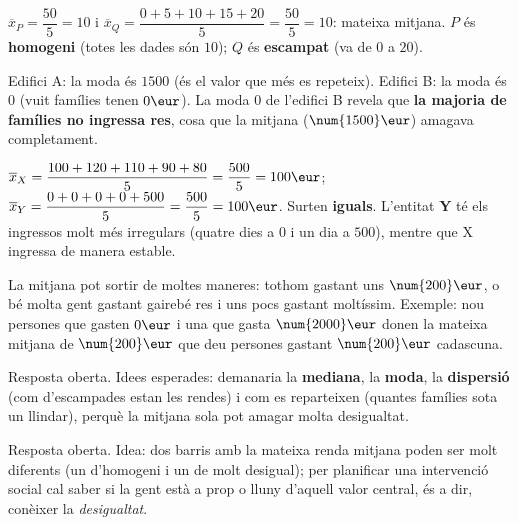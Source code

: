 \begin{solucions}
\begin{sollist}
  \item $\overline{x}_P=\dfrac{50}{5}=10$ i $\overline{x}_Q=\dfrac{0+5+10+15+20}{5}=\dfrac{50}{5}=10$:
        mateixa mitjana. $P$ és \textbf{homogeni} (totes les dades són $10$); $Q$ és
        \textbf{escampat} (va de $0$ a $20$).
  \item Edifici A: la moda és $\num{1500}$ (és el valor que més es repeteix). Edifici
        B: la moda és $0$ (vuit famílies tenen $0\eur$). La moda $0$ de l'edifici B
        revela que \textbf{la majoria de famílies no ingressa res}, cosa que la
        mitjana ($\num{1500}\eur$) amagava completament.
  \item $\overline{x}_X=\dfrac{100+120+110+90+80}{5}=\dfrac{500}{5}=100\eur$;
        $\overline{x}_Y=\dfrac{0+0+0+0+500}{5}=\dfrac{500}{5}=100\eur$. Surten
        \textbf{iguals}. L'entitat \textbf{Y} té els ingressos molt més irregulars
        (quatre dies a $0$ i un dia a $500$), mentre que X ingressa de manera estable.
  \item La mitjana pot sortir de moltes maneres: tothom gastant uns $\num{200}\eur$,
        o bé molta gent gastant gairebé res i uns pocs gastant moltíssim. Exemple:
        nou persones que gasten $0\eur$ i una que gasta $\num{2000}\eur$ donen la
        mateixa mitjana de $\num{200}\eur$ que deu persones gastant $\num{200}\eur$
        cadascuna.
  \item Resposta oberta. Idees esperades: demanaria la \textbf{mediana}, la
        \textbf{moda}, la \textbf{dispersió} (com d'escampades estan les rendes) i com
        es reparteixen (quantes famílies sota un llindar), perquè la mitjana sola pot
        amagar molta desigualtat.
  \item Resposta oberta. Idea: dos barris amb la mateixa renda mitjana poden ser molt
        diferents (un d'homogeni i un de molt desigual); per planificar una
        intervenció social cal saber si la gent està a prop o lluny d'aquell valor
        central, és a dir, conèixer la \emph{desigualtat}.
\end{sollist}
\end{solucions}
